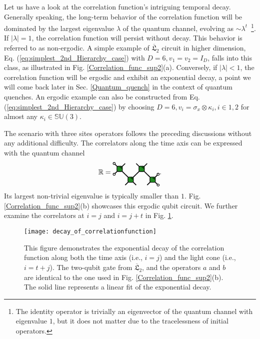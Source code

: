 \documentclass[aps,prx,twocolumn,notitlepage,nofootinbib,nobalancelastpage]{revtex4-2}
\theoremstyle{break}
\newcommand{\1}{\mathbbm{1}}
\theoremstyle{plain}
\theoremstyle{plain}
\theoremstyle{plain}
\newcommand{\Wgategreen}[2]{
\draw[very thick] (#1-0.5, #2 +0.5) -- (#1+0.5,#2-0.5);
\draw[very thick] (#1-0.5,#2-0.5) -- (#1+0.5,#2+0.5);
\draw[ thick, fill=mygreen, rounded corners=2pt] (#1-0.25,#2+0.25) rectangle (#1+0.25,#2-0.25);
\draw[thick] (#1,#2+0.15) -- (#1+0.15,#2+0.15) -- (#1+0.15,#2);
}
\newcommand{\MYcircle}[2]{
\draw[thick, fill=white] (#1,#2) circle (0.1cm); }
\newcommand{\pk}[1]{{\color{blue}[#1]}}
\begin{document}
Let us have a look at the correlation function's intriguing temporal decay. Generally speaking, the long-term behavior of the correlation function will be dominated by the largest eigenvalue $\lambda$ of the quantum channel, evolving as $\sim \lambda^t$~\footnote{The identity operator is trivially an eigenvector of the quantum channel with eigenvalue $1$, but it does not matter due to the tracelessness of initial operators.}. 
If $|\lambda|=1$, the correlation function will persist without decay. This behavior is referred to as non-ergodic. 
%
A simple example of $\overline{\mathfrak{L}}_2$ circuit in higher dimension, Eq. (\ref{eq:simplest_2nd_Hierarchy_case}) with $D=6,v_1=v_2=I_D$, falls into this class, as illustrated in Fig. \ref{Correlation_func_sup2}(a). Conversely, if $|\lambda|<1$, the correlation function will be ergodic and exhibit an exponential decay, a point we will come back later in Sec. \ref{Quantum_quench} in the context of quantum quenches. An ergodic example can also be constructed from Eq. (\ref{eq:simplest_2nd_Hierarchy_case}) by choosing $D=6,v_i=\sigma_x\otimes\kappa_i,i\in{1,2}$ for almost any $\kappa_i\in\mathbb{SU}(3)$.


The scenario with three sites operators  follows
 the preceding discussions without any additional difficulty. The correlators along the time axis can be expressed with the quantum channel 
 \begin{equation}
 \mathbb{R}=\begin{tikzpicture}[baseline=(current bounding box.center), scale=0.55]
\Wgategreen{0}{0}
\Wgategreen{2}{0}
\Wgategreen{-1}{1}
\Wgategreen{1}{1}
\MYcircle{2.5}{-0.5}
\MYcircle{2.5}{0.5}
\MYcircle{-1.5}{0.5}
\MYcircle{-1.5}{1.5}
\end{tikzpicture}.
\end{equation}
%
Its largest non-trivial eigenvalue is typically smaller than $1$.
Fig. \ref{Correlation_func_sup2}(b) showcases this ergodic qubit circuit. We further examine the correlators at $i=j$ and $i=j+t$ in Fig. \ref{exponential_decay_CF}. %


\begin{figure}
\texttt{[image: decay\_of\_correlationfunction]}

\caption{This figure demonstrates the exponential decay of the correlation function along both the time axis (i.e., $i=j$) and the light cone (i.e., $i=t+j$). The two-qubit gate from $\overline{\mathfrak{L}}_2$, and the operators $a$ and $b$ are identical to the one used in Fig. \ref{Correlation_func_sup2}(b). The solid line represents a linear fit of the exponential decay.
}

\label{exponential_decay_CF}
\end{figure}
\end{document}
